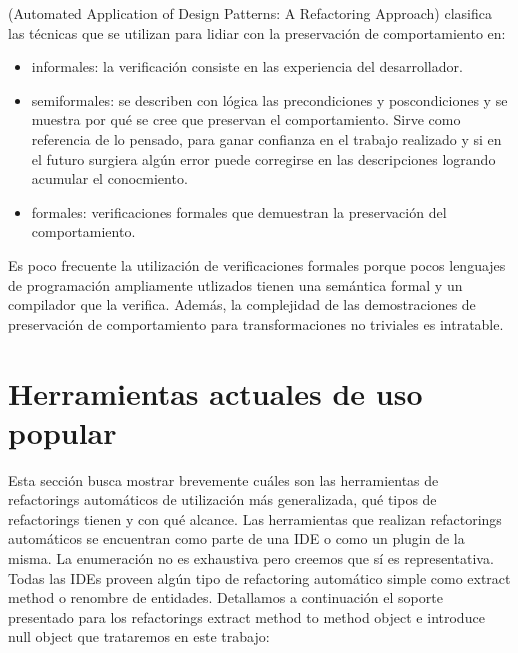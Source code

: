 (Automated Application of Design Patterns: A Refactoring Approach) clasifica las técnicas que se
utilizan para lidiar con la preservación de comportamiento en:

\begin{itemize}
    \item informales: la verificación consiste en las experiencia del desarrollador.
    \item semiformales: se describen con lógica las precondiciones y poscondiciones y se muestra por
    qué se cree que preservan el comportamiento. Sirve como referencia de lo pensado, para ganar
    confianza en el trabajo realizado y si en el futuro surgiera algún error puede corregirse en las
    descripciones logrando acumular el conocmiento.
    \item formales: verificaciones formales que demuestran la preservación del comportamiento.
\end{itemize}

Es poco frecuente la utilización de verificaciones formales porque pocos lenguajes de programación
ampliamente utlizados tienen una semántica formal y un compilador que la verifica. Además, la
complejidad de las demostraciones de preservación de comportamiento para transformaciones no
triviales es intratable.



\section{Herramientas actuales de uso popular}
Esta sección busca mostrar brevemente cuáles son las herramientas de refactorings automáticos
de utilización más generalizada, qué tipos de refactorings tienen y con qué alcance. Las herramientas
que realizan refactorings automáticos se encuentran como parte de una IDE o como un plugin de la
misma. La enumeración no es exhaustiva pero creemos que sí es representativa. Todas las IDEs proveen
algún tipo de refactoring automático simple como extract method o renombre de entidades. Detallamos
a continuación el soporte presentado para los refactorings extract method to method object e
introduce null object que trataremos en este trabajo:


